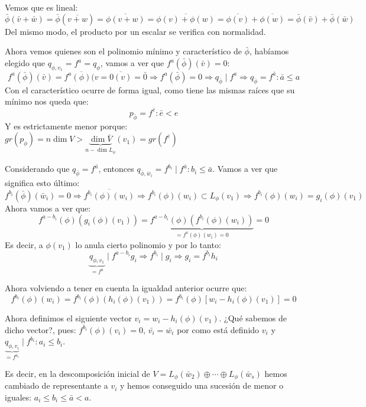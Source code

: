 \documentclass[10pt,a4paper,openright]{book}
\begin{document}
\begin{itemize}
Vemos que es lineal:
$$\bar{\phi}(\bar{v}+\bar{w})=\bar{\phi}(\overline{v+w})=\overline{\phi(v+w)}=\overline{\phi(v)+\phi(w)}=\overline{\phi(v)}+\overline{\phi(w)}=\bar{\phi}(\bar{v})+\bar{\phi}(\bar{w})$$
Del mismo modo, el producto por un escalar se verifica con normalidad.

Ahora vemos quienes son el polinomio mínimo y característico de $\bar{\phi}$, habíamos elegido que $q_{\phi, v_1}=f^a=q_\phi$, vamos a ver que $f^a(\bar{\phi})(\bar{v})=0$:
$$f^a(\bar{\phi})(\bar{v})=\overline{f^a(\phi)(v}=\overline{0(v)}=\bar{0}\Rightarrow f^a(\bar{\phi})=0\Rightarrow q_{\bar{\phi}}\mid f^a\Rightarrow q_{\bar{\phi}}=f^{\bar{a}}: \bar{a} \leq a$$
Con el característico ocurre de forma igual, como tiene las mismas raíces que su mínimo nos queda que:
$$p_{\bar{\phi}}=f^{\bar{e}}: \bar{e}< e$$
Y es estrictamente menor porque: $gr(p_\phi)=n\dim V> \underbrace{\dim \bar{V}}_{n-\dim L_\phi}(v_1)=gr(f^{\bar{e}})$

Considerando que $q_{\bar{\phi}}=f^{\bar{a}}$, entonces $q_{\bar{\phi}, \bar{w}_i}=f^{b_i}\mid f^{\bar{a}}: b_i\leq \bar{a}$. Vamos a ver que significa esto último:
$$f^{b_i}(\bar{\phi})(\bar{w}_i)=0\Rightarrow \overline{f^{b_i}(\phi)(w_i)}\Rightarrow f^{b_i}(\phi)(w_i)\subset L_\phi(v_1)\Rightarrow f^{b_i}(\phi)(w_i)=g_i(\phi)(v_1)$$
Ahora vamos a ver que:
$$f^{a-b_i}(\phi)\left(g_i(\phi)(v_1)\right)=\underbrace{f^{a-b_i}(\phi)\left(f^{b_i}(\phi)(w_i)\right)}_{=f^a(\phi)(w_i)=0}=0$$
Es decir, a $\phi(v_1)$ lo anula cierto polinomio y por lo tanto:
$$\underbrace{q_{\phi, v_1}}_{=f^a}\mid f^{a-b_i}g_i\Rightarrow f^{b_i}\mid g_i\Rightarrow g_i=f^{b_i}h_i$$

Ahora volviendo a tener en cuenta la igualdad anterior ocurre que:
$$f^{b_i}(\phi)(w_i)=f^{b_i}(\phi)\left(h_i(\phi)(v_1)\right)=f^{b_i}(\phi)\left[w_i-h_i(\phi)(v_1)\right]=0$$

Ahora definimos el siguiente vector $v_i=w_i-h_i(\phi)(v_1)$. ¿Qué sabemos de dicho vector?, pues: $f^{b_i}(\phi)(v_i)=0$, $\bar{v_i}=\bar{w_i}$ por como está definido $v_i$ y $\underbrace{q_{\phi, v_i}}_{=f^{a_i}}\mid f^{b_i}: a_i\leq b_i$.

Es decir, en la descomposición inicial de $V=L_\phi(\bar{w}_2)\oplus \cdots \oplus L_\phi(\bar{w}_s)$ hemos cambiado de representante a $v_i$ y hemos conseguido una sucesión de menor o iguales: $a_i\leq b_i \leq \bar{a} <a$.


\end{itemize}
\end{document}
